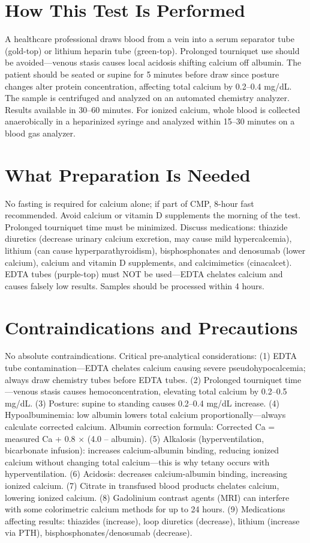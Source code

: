 \section*{How This Test Is Performed}
A healthcare professional draws blood from a vein into a serum separator tube (gold-top) or lithium heparin tube (green-top). Prolonged tourniquet use should be avoided---venous stasis causes local acidosis shifting calcium off albumin. The patient should be seated or supine for 5 minutes before draw since posture changes alter protein concentration, affecting total calcium by 0.2--0.4 mg/dL. The sample is centrifuged and analyzed on an automated chemistry analyzer. Results available in 30--60 minutes. For ionized calcium, whole blood is collected anaerobically in a heparinized syringe and analyzed within 15--30 minutes on a blood gas analyzer.

\section*{What Preparation Is Needed}
No fasting is required for calcium alone; if part of CMP, 8-hour fast recommended. Avoid calcium or vitamin D supplements the morning of the test. Prolonged tourniquet time must be minimized. Discuss medications: thiazide diuretics (decrease urinary calcium excretion, may cause mild hypercalcemia), lithium (can cause hyperparathyroidism), bisphosphonates and denosumab (lower calcium), calcium and vitamin D supplements, and calcimimetics (cinacalcet). EDTA tubes (purple-top) must NOT be used---EDTA chelates calcium and causes falsely low results. Samples should be processed within 4 hours.

\section*{Contraindications and Precautions}
No absolute contraindications. Critical pre-analytical considerations: (1) EDTA tube contamination---EDTA chelates calcium causing severe pseudohypocalcemia; always draw chemistry tubes before EDTA tubes. (2) Prolonged tourniquet time---venous stasis causes hemoconcentration, elevating total calcium by 0.2--0.5 mg/dL. (3) Posture: supine to standing causes 0.2--0.4 mg/dL increase. (4) Hypoalbuminemia: low albumin lowers total calcium proportionally---always calculate corrected calcium. Albumin correction formula: Corrected Ca = measured Ca + 0.8 $\times$ (4.0 -- albumin). (5) Alkalosis (hyperventilation, bicarbonate infusion): increases calcium-albumin binding, reducing ionized calcium without changing total calcium---this is why tetany occurs with hyperventilation. (6) Acidosis: decreases calcium-albumin binding, increasing ionized calcium. (7) Citrate in transfused blood products chelates calcium, lowering ionized calcium. (8) Gadolinium contrast agents (MRI) can interfere with some colorimetric calcium methods for up to 24 hours. (9) Medications affecting results: thiazides (increase), loop diuretics (decrease), lithium (increase via PTH), bisphosphonates/denosumab (decrease).

